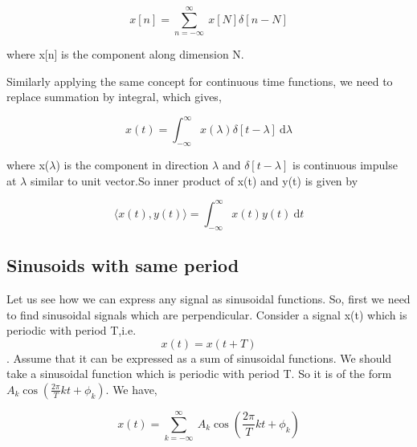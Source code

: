     	\begin{equation*}	x[n] = 	\sum_{n=-\infty}^{\infty}\ x[N]\delta[n-N]\end{equation*}
            
            where x[n] is the component along dimension N.
       
Similarly applying the same concept for continuous time functions, we need to replace summation by integral, which gives,

					\begin{equation*}x(t) = \int_{-\infty}^{\infty} \! x(\lambda)\delta[t-\lambda] \ \mathrm{d}\lambda\end{equation*}
                    
             where x($\lambda$) is the component in direction $\lambda$ and $\delta[t-\lambda]$ is continuous impulse at $\lambda$ similar to unit vector.So inner product of x(t) and y(t) is given by
             
           \begin{equation*} \langle x(t),y(t) \rangle = \int_{-\infty}^{\infty} \! x(t)y(t) \ \mathrm{d} t\end{equation*}
             
 \subsection{Sinusoids with same period}
          Let us see how we can express any signal as sinusoidal functions. So, first we need to find sinusoidal signals which are perpendicular. Consider a signal x(t) which is periodic with period T,i.e. \begin{equation*}  x(t) = x(t+T)\end{equation*}. Assume that it can be expressed as a sum of sinusoidal functions. We should take a sinusoidal function which is periodic with period T. So it is of the form $A_k\cos (\frac{2\pi}{T}kt + \phi_k)$. We have,
          
          \begin{equation*}x(t) = \sum_{k=-\infty}^{\infty}\ A_k\cos (\frac{2\pi}{T}kt + \phi_k)\end{equation*}
          
